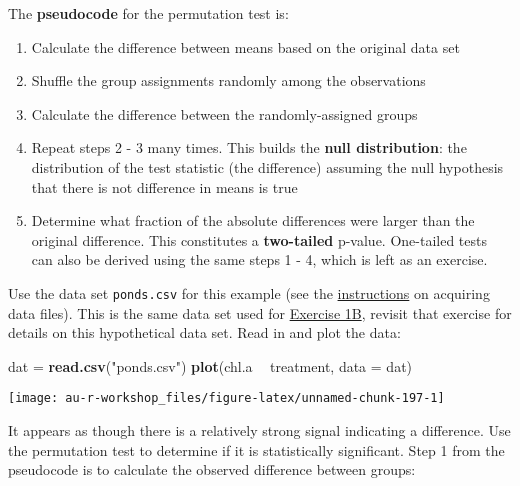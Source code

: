 \documentclass[]{book}
\newenvironment{Shaded}{\begin{snugshade}}{\end{snugshade}}
\newcommand{\KeywordTok}[1]{\textcolor[rgb]{0.13,0.29,0.53}{\textbf{#1}}}
\newcommand{\DataTypeTok}[1]{\textcolor[rgb]{0.13,0.29,0.53}{#1}}
\newcommand{\StringTok}[1]{\textcolor[rgb]{0.31,0.60,0.02}{#1}}
\newcommand{\OperatorTok}[1]{\textcolor[rgb]{0.81,0.36,0.00}{\textbf{#1}}}
\newcommand{\NormalTok}[1]{#1}
\providecommand{\tightlist}{%
  \setlength{\itemsep}{0pt}\setlength{\parskip}{0pt}}
\theoremstyle{definition}
\theoremstyle{definition}
\theoremstyle{definition}
\theoremstyle{remark}
\begin{document}
The \textbf{pseudocode} for the permutation test is:

\begin{enumerate}
\def\labelenumi{\arabic{enumi}.}
\tightlist
\item
  Calculate the difference between means based on the original data set
\item
  Shuffle the group assignments randomly among the observations
\item
  Calculate the difference between the randomly-assigned groups
\item
  Repeat steps 2 - 3 many times. This builds the \textbf{null
  distribution}: the distribution of the test statistic (the difference)
  assuming the null hypothesis that there is not difference in means is
  true
\item
  Determine what fraction of the absolute differences were larger than
  the original difference. This constitutes a \textbf{two-tailed}
  p-value. One-tailed tests can also be derived using the same steps 1 -
  4, which is left as an exercise.
\end{enumerate}

Use the data set \texttt{ponds.csv} for this example (see the
\protect\hyperlink{data-sets}{instructions} on acquiring data files).
This is the same data set used for \protect\hyperlink{ex1b}{Exercise
1B}, revisit that exercise for details on this hypothetical data set.
Read in and plot the data:

\begin{Shaded}
\begin{Highlighting}[]
\NormalTok{dat =}\StringTok{ }\KeywordTok{read.csv}\NormalTok{(}\StringTok{"ponds.csv"}\NormalTok{)}
\KeywordTok{plot}\NormalTok{(chl.a }\OperatorTok{~}\StringTok{ }\NormalTok{treatment, }\DataTypeTok{data =}\NormalTok{ dat)}
\end{Highlighting}
\end{Shaded}

\begin{center}\texttt{[image: au-r-workshop\_files/figure-latex/unnamed-chunk-197-1]} \end{center}

It appears as though there is a relatively strong signal indicating a
difference. Use the permutation test to determine if it is statistically
significant. Step 1 from the pseudocode is to calculate the observed
difference between groups:

\begin{Shaded}
\end{Shaded}
\end{document}
